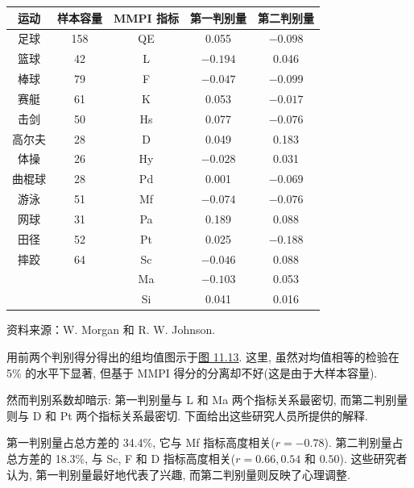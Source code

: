 
\begin{mvtable}
\label{tab:11.3}
\begin{tabular}{cc||ccc}
\toprule
运动 & 样本容量 & MMPI 指标 & 第一判别量 & 第二判别量 \\
\midrule
足球 & 158 & QE & 0.055 & $-0.098$ \\
篮球 & 42 & L & $-0.194$ & 0.046 \\
棒球 & 79 & F & $-0.047$ & $-0.099$ \\
赛艇 & 61 & K & 0.053 & $-0.017$ \\
击剑 & 50 & Hs & 0.077 & $-0.076$ \\
高尔夫 & 28 & D & 0.049 & 0.183 \\
体操 & 26 & Hy & $-0.028$ & 0.031 \\
曲棍球 & 28 & Pd & 0.001 & $-0.069$ \\
游泳 & 51 & Mf & $-0.074$ & $-0.076$ \\
网球 & 31 & Pa & 0.189 & 0.088 \\
田径 & 52 & Pt & 0.025 & $-0.188$ \\
摔跤 & 64 & Sc & $-0.046$ & 0.088 \\
 &  & Ma & $-0.103$ & 0.053 \\
 &  & Si & 0.041 & 0.016 \\
\bottomrule
\end{tabular}
\end{mvtable}

{ 资料来源：W. Morgan 和 R. W. Johnson.}

用前两个判别得分得出的组均值图示于\hyperref[fig:11.13]{图 11.13}. 这里, 虽然对均值相等的检验在 5\% 的水平下显著, 但基于 MMPI 得分的分离却不好(这是由于大样本容量).

\begin{mvfigure}
\label{fig:11.13}
\end{mvfigure}

然而判别系数却暗示: 第一判别量与 L 和 Ma 两个指标关系最密切, 而第二判别量则与 D 和 Pt 两个指标关系最密切. 下面给出这些研究人员所提供的解释.

第一判别量占总方差的 34.4\%, 它与 Mf 指标高度相关($r=-0.78$). 第二判别量占总方差的 18.3\%, 与 Sc, F 和 D 指标高度相关($r=0.66,0.54$ 和 $0.50$). 这些研究者认为, 第一判别量最好地代表了兴趣, 而第二判别量则反映了心理调整.
